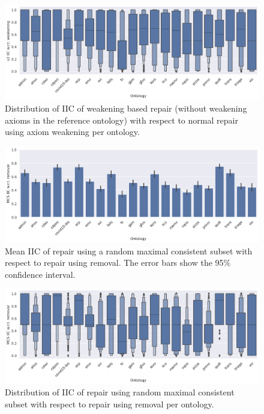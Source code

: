 \begin{figure}[ht]
    \centering
    \includegraphics[width=\textwidth]{resources/iic-enhance-weaken-ontology-violin.png}
    \caption{Distribution of IIC of weakening based repair (without weakening axioms in the reference ontology) with respect to normal repair using axiom weakening per ontology.}
\end{figure}

\begin{figure}[ht]
  \centering
  \includegraphics[width=\textwidth]{resources/iic-mcs-rem-ontology-bar.png}
  \caption{Mean IIC of repair using a random maximal consistent subset with respect to repair using removal. The error bars show the 95\% confidence interval.}
\end{figure}

\begin{figure}[ht]
    \centering
    \includegraphics[width=\textwidth]{resources/iic-mcs-rem-ontology-violin.png}
    \caption{Distribution of IIC of repair using random maximal consistent subset with respect to repair using removal per ontology.}
\end{figure}

